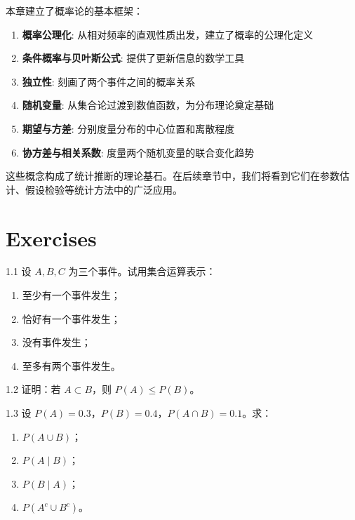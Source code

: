 本章建立了概率论的基本框架：

\begin{enumerate}
    \item \textbf{概率公理化}: 从相对频率的直观性质出发，建立了概率的公理化定义
    \item \textbf{条件概率与贝叶斯公式}: 提供了更新信息的数学工具
    \item \textbf{独立性}: 刻画了两个事件之间的概率关系
    \item \textbf{随机变量}: 从集合论过渡到数值函数，为分布理论奠定基础
    \item \textbf{期望与方差}: 分别度量分布的中心位置和离散程度
    \item \textbf{协方差与相关系数}: 度量两个随机变量的联合变化趋势
\end{enumerate}

这些概念构成了统计推断的理论基石。在后续章节中，我们将看到它们在参数估计、假设检验等统计方法中的广泛应用。

\section*{Exercises}\label{sec:chapter1-exercises}

\begin{exercise}{1.1}
设 $A, B, C$ 为三个事件。试用集合运算表示：
\begin{enumerate}
    \item 至少有一个事件发生；
    \item 恰好有一个事件发生；
    \item 没有事件发生；
    \item 至多有两个事件发生。
\end{enumerate}
\end{exercise}

\begin{exercise}{1.2}
证明：若 $A \subset B$，则 $P(A) \leq P(B)$。
\end{exercise}

\begin{exercise}{1.3}
设 $P(A) = 0.3$，$P(B) = 0.4$，$P(A \cap B) = 0.1$。求：
\begin{enumerate}
    \item $P(A \cup B)$；
    \item $P(A \mid B)$；
    \item $P(B \mid A)$；
    \item $P(A^c \cup B^c)$。
\end{enumerate}
\end{exercise}

